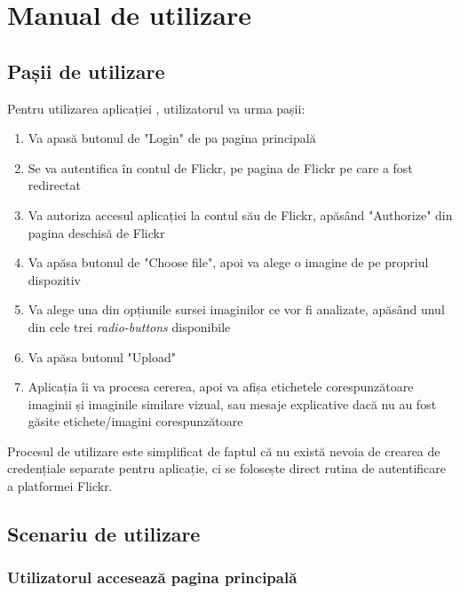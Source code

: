 \chapter{Manual de utilizare}

\section{Pașii de utilizare}
Pentru utilizarea aplicației {\applicationtitle}, utilizatorul va urma pașii:
\begin{enumerate}
    \item Va apasă butonul de "Login" de pa pagina principală
    \item Se va autentifica în contul de Flickr, pe pagina de Flickr pe care a fost redirectat
    \item Va autoriza accesul aplicației la contul său de Flickr, apăsând "Authorize" din pagina deschisă de Flickr
    \item Va apăsa butonul de "Choose file", apoi va alege o imagine de pe propriul dispozitiv
    \item Va alege una din opțiunile sursei imaginilor ce vor fi analizate, apăsând unul din cele trei \textit{radio-buttons} disponibile
    \item Va apăsa butonul "Upload"
    \item Aplicația îi va procesa cererea, apoi va afișa etichetele corespunzătoare imaginii și imaginile similare vizual, sau mesaje explicative dacă nu au fost găsite etichete/imagini corespunzătoare
\end{enumerate}{}

Procesul de utilizare  este simplificat de faptul că nu există nevoia de crearea de credențiale separate pentru aplicație, ci se folosește direct rutina de autentificare a platformei Flickr. 

\section{Scenariu de utilizare}
\subsection{Utilizatorul accesează pagina principală}

